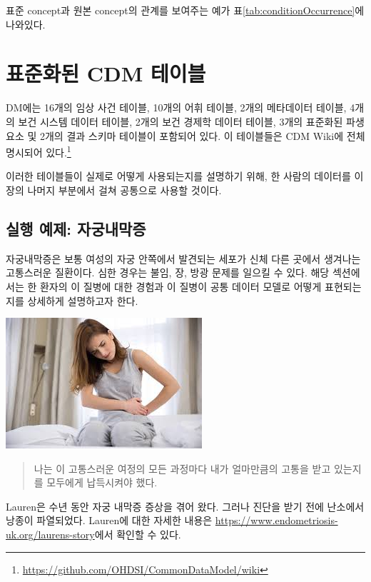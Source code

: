 \documentclass[11pt]{book}
\let\rmarkdownfootnote\footnote%
\def\footnote{\protect\rmarkdownfootnote}
\theoremstyle{definition}
\theoremstyle{definition}
\theoremstyle{definition}
\theoremstyle{remark}
\begin{document}
표준 concept과 원본 concept의 관계를 보여주는 예가
표\ref{tab:conditionOccurrence}에 나와있다.

\section{표준화된 CDM 테이블}\label{-cdm-}


DM에는 16개의 임상 사건 테이블, 10개의 어휘 테이블, 2개의 메타데이터
테이블, 4개의 보건 시스템 데이터 테이블, 2개의 보건 경제학 데이터
테이블, 3개의 표준화된 파생 요소 및 2개의 결과 스키마 테이블이 포함되어
있다. 이 테이블들은 CDM Wiki에 전체 명시되어 있다.\footnote{\url{https://github.com/OHDSI/CommonDataModel/wiki}}

이러한 테이블들이 실제로 어떻게 사용되는지를 설명하기 위해, 한 사람의
데이터를 이 장의 나머지 부분에서 걸쳐 공통으로 사용할 것이다.

\subsection{실행 예제: 자궁내막증}\label{--}

자궁내막증은 보통 여성의 자궁 안쪽에서 발견되는 세포가 신체 다른 곳에서
생겨나는 고통스러운 질환이다. 심한 경우는 불임, 장, 방광 문제를 일으킬
수 있다. 해당 섹션에서는 한 환자의 이 질병에 대한 경험과 이 질병이 공통
데이터 모델로 어떻게 표현되는지를 상세하게 설명하고자 한다.

\begin{center}\includegraphics[width=0.5\linewidth]{images/CommonDataModel/Lauren} \end{center}

\begin{quote}
나는 이 고통스러운 여정의 모든 과정마다 내가 얼마만큼의 고통을 받고
있는지를 모두에게 납득시켜야 했다.
\end{quote}

Lauren은 수년 동안 자궁 내막증 증상을 겪어 왔다. 그러나 진단을 받기 전에
난소에서 낭종이 파열되었다. Lauren에 대한 자세한 내용은
\url{https://www.endometriosis-uk.org/laurens-story}에서 확인할 수 있다.
\end{document}
